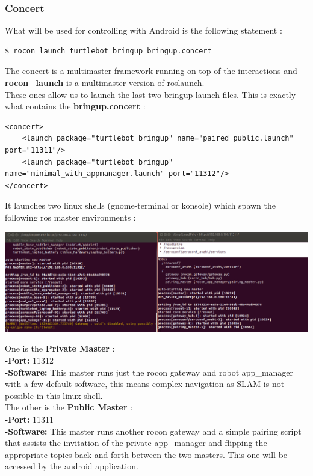 \documentclass[10pt,a4paper]{article}
\begin{document}
\subsubsection{Concert}

What will be used for controlling with Android is the following statement : 
\begin{lstlisting}[frame=single]
$ rocon_launch turtlebot_bringup bringup.concert
\end{lstlisting}


 The concert is a multimaster framework running on top of the interactions and \textbf{rocon\_launch} is a multimaster version of roslaunch.\\
 
These ones allow us to launch the last two bringup launch files.
This is exactly what contains the \textbf{bringup.concert} : 
\begin{lstlisting}[frame=single]
<concert>
    <launch package="turtlebot_bringup" name="paired_public.launch" port="11311"/>
    <launch package="turtlebot_bringup" name="minimal_with_appmanager.launch" port="11312"/>
</concert>
\end{lstlisting}

It launches two linux shells (gnome-terminal or konsole) which spawn the following ros master environments : 

\begin{center}
\includegraphics[scale=0.4]{images/twoMasters.png}
\end{center}

One is the \textbf{Private Master} : \\
\textbf{-Port:} 11312 \\
\textbf{-Software:} This master runs just the rocon gateway and robot app\_manager with a few default software, this means complex navigation as SLAM is not possible in this linux shell.\\

The other is the \textbf{Public Master} : \\
\textbf{-Port:} 11311 \\
\textbf{-Software:} This master runs another rocon gateway and a simple pairing script that assists the invitation of the private app\_manager and flipping the appropriate topics back and forth between the two masters. This one will be accessed by the android application. 
\end{document}

